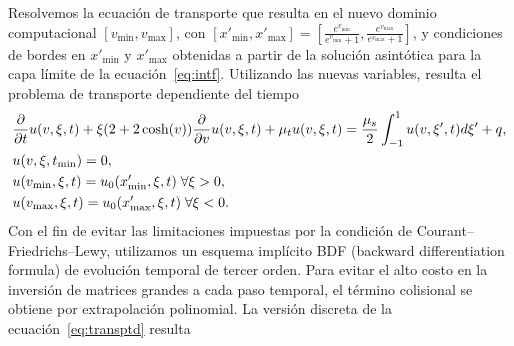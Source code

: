 Resolvemos la ecuación de transporte que resulta en el nuevo dominio computacional
$[v_{\text{min}},v_{\text{max}}]$, con 
$[x'_{\text{min}},x'_{\text{max}}]=[\frac{e^{v_{\text{min}}}}{e^{v_{\text{min}}}+1},
\frac{e^{v_{\text{max}}}}{e^{v_{\text{max}}}+1}]$, 
y condiciones de bordes en $x'_{\text{min}}$ y $x'_{\text{max}}$ 
obtenidas a partir de la solución asintótica para la capa límite 
de la ecuación~\eqref{eq:intf}. Utilizando las nuevas variables, 
resulta el problema de transporte dependiente del tiempo
\begin{equation}
\begin{split}
&\frac{\partial}{\partial t}u(v,\xi,t)+\xi(2+2\cosh(v)) \frac{\partial}{\partial v}u(v,\xi,t)+
\mu_tu(v,\xi,t)=\frac{\mu_s}{2} \int_{-1}^{1} u(v,\xi',t) d\xi'+q, \\
&u(v,\xi,t_{\text{min}})=0,\\
&u(v_{\text{min}},\xi,t)=u_{0}(x'_{\text{min}},\xi,t) \; \forall \xi>0,\\
&u(v_{\text{max}},\xi,t)=u_{0}(x'_{\text{max}},\xi,t) \; \forall \xi<0.
\end{split}
\label{eq:transptd}
\end{equation}
Con el fin de evitar las
limitaciones impuestas por la condición de Courant–Friedrichs–Lewy, utilizamos un 
esquema implícito BDF (backward differentiation formula) de evolución temporal de tercer orden. 
Para evitar el alto costo en la inversión de matrices grandes a 
cada paso temporal, el término 
colisional se obtiene por extrapolación polinomial. La versión discreta 
de la ecuación~\eqref{eq:transptd} resulta
